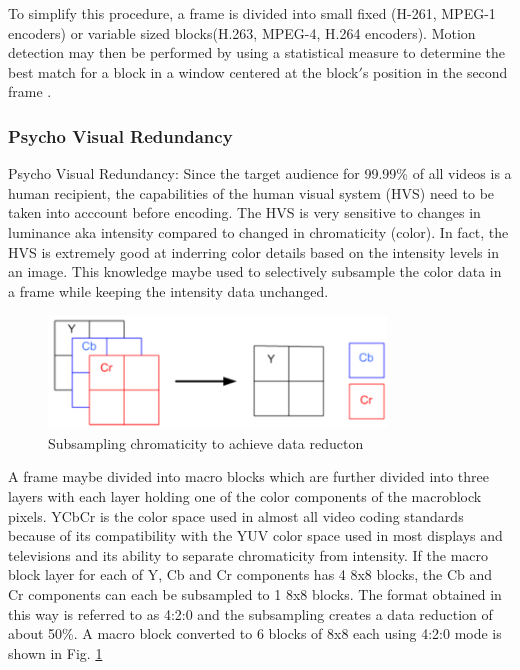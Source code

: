 \documentclass[letterpaper,12pt,titlepage,oneside,final]{report}
\begin{document}
                To simplify this procedure, a frame is divided into small fixed (H-261, MPEG-1 encoders) or variable sized blocks(H.263, MPEG-4, H.264 encoders). Motion detection may then be performed by using a statistical measure to determine the best match for a block in a window centered at the block$'$s position in the second frame \cite{Choupani}.

            \subsubsection{Psycho Visual Redundancy} %
                \label{sub:psv_redundancy}  
                Psycho Visual Redundancy: Since the target audience for 99.99\% of all videos is a human recipient, the capabilities of the human visual system (HVS) need to be taken into acccount before encoding. The HVS is very sensitive to changes in luminance aka intensity compared to changed in chromaticity (color). In fact, the HVS is extremely good at inderring color details based on the intensity levels in an image. This knowledge maybe used to selectively subsample the color data in a frame while keeping the intensity data unchanged. 

                \begin{figure}[!h]
                    \centering
                    \includegraphics[width=0.8\textwidth]{psychredun}
                    \caption{Subsampling chromaticity to achieve data reducton\cite{Choupani}}
                    \label{psychredun}
                \end{figure}

                A frame maybe divided into macro blocks which are further divided into three layers with each layer holding one of the color components of the macroblock pixels. YCbCr is the color space used in almost all video coding standards because of its compatibility with the YUV color space used in most displays and televisions and its ability to separate chromaticity from intensity. If the macro block layer for each of Y, Cb and Cr components has 4 8x8 blocks, the Cb and Cr components can each be subsampled to 1 8x8 blocks. The format obtained in this way is referred to as 4:2:0 and the subsampling creates a data reduction of about 50\%. A macro block converted to 6 blocks of 8x8 each using 4:2:0 mode is shown in Fig. \ref{psychredun}
\end{document}
